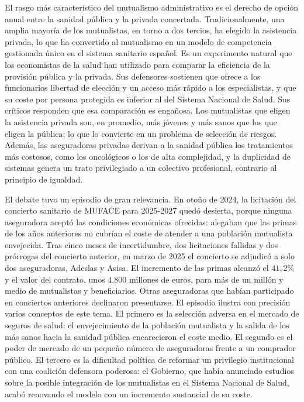 \documentclass[10pt,a4paper]{article}
\begin{document}
El rasgo más característico del mutualismo administrativo es el derecho de opción anual entre la sanidad pública y la privada concertada. Tradicionalmente, una amplia mayoría de los mutualistas, en torno a dos tercios, ha elegido la asistencia privada, lo que ha convertido al mutualismo en un modelo de competencia gestionada único en el sistema sanitario español. Es un experimento natural que los economistas de la salud han utilizado para comparar la eficiencia de la provisión pública y la privada. Sus defensores sostienen que ofrece a los funcionarios libertad de elección y un acceso más rápido a los especialistas, y que su coste por persona protegida es inferior al del Sistema Nacional de Salud. Sus críticos responden que esa comparación es engañosa. Los mutualistas que eligen la asistencia privada son, en promedio, más jóvenes y más sanos que los que eligen la pública; lo que lo convierte en un problema de selección de riesgos. Además, las aseguradoras privadas derivan a la sanidad pública los tratamientos más costosos, como los oncológicos o los de alta complejidad, y la duplicidad de sistemas genera un trato privilegiado a un colectivo profesional, contrario al principio de igualdad.

El debate tuvo un episodio de gran relevancia. En otoño de 2024, la licitación del concierto sanitario de MUFACE para 2025-2027 quedó desierta, porque ninguna aseguradora aceptó las condiciones económicas ofrecidas: alegaban que las primas de los años anteriores no cubrían el coste de atender a una población mutualista envejecida. Tras cinco meses de incertidumbre, dos licitaciones fallidas y dos prórrogas del concierto anterior, en marzo de 2025 el concierto se adjudicó a solo dos aseguradoras, Adeslas y Asisa. El incremento de las primas alcanzó el $41,2\%$ y el valor del contrato, unos $4.800$ millones de euros, para más de un millón y medio de mutualistas y beneficiarios. Otras aseguradoras que habían participado en conciertos anteriores declinaron presentarse. El episodio ilustra con precisión varios conceptos de este tema. El primero es la selección adversa en el mercado de seguros de salud: el envejecimiento de la población mutualista y la salida de los más sanos hacia la sanidad pública encarecieron el coste medio. El segundo es el poder de mercado de un pequeño número de aseguradoras frente a un comprador público. El tercero es la dificultad política de reformar un privilegio institucional con una coalición defensora poderosa: el Gobierno, que había anunciado estudios sobre la posible integración de los mutualistas en el Sistema Nacional de Salud, acabó renovando el modelo con un incremento sustancial de su coste.
\end{document}
